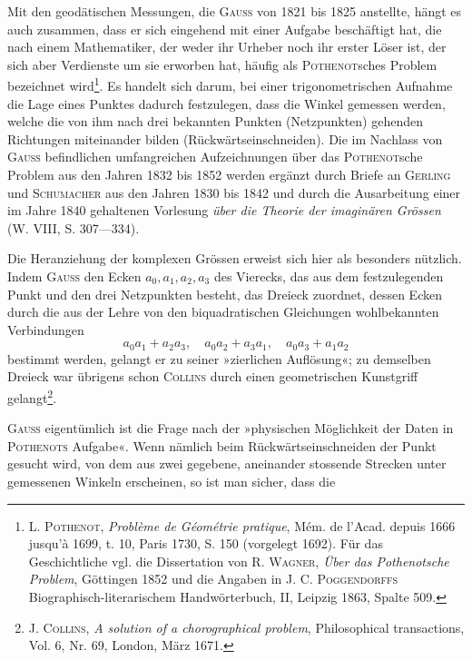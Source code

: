 \par
Mit den geodätischen Messungen, die \textsc{Gauss} von 1821 bis 1825 anstellte,
hängt es auch zusammen, dass er sich eingehend mit einer Aufgabe beschäftigt
hat, die nach einem Mathematiker, der weder ihr Urheber noch ihr erster
Löser ist, der sich aber Verdienste um sie erworben hat, häufig als \textsc{Pothenot}sches
Problem bezeichnet wird\footnote{L. \textsc{Pothenot}, \textit{Problème de Géométrie pratique}, Mém. de l’Acad. depuis 1666 jusqu’à 1699, t. 10, Paris 1730, S. 150 (vorgelegt 1692). Für das Geschichtliche vgl. die Dissertation von R. \textsc{Wagner}, \textit{Über das Pothenotsche Problem}, Göttingen 1852 und die Angaben in J. C. \textsc{Poggendorffs} Biographisch-literarischem Handwörterbuch, II, Leipzig 1863, Spalte 509.}. Es handelt sich darum, bei einer trigonometrischen
Aufnahme die Lage eines Punktes dadurch festzulegen, dass die
Winkel gemessen werden, welche die von ihm nach drei bekannten Punkten
(Netzpunkten) gehenden Richtungen miteinander bilden (Rückwärtseinschneiden).
Die im Nachlass von \textsc{Gauss} befindlichen umfangreichen Aufzeichnungen über
das \textsc{Pothenot}sche Problem aus den Jahren 1832 bis 1852 werden ergänzt
durch Briefe an \textsc{Gerling} und \textsc{Schumacher} aus den Jahren 1830 bis 1842 und
durch die Ausarbeitung einer im Jahre 1840 gehaltenen Vorlesung \textit{über die
Theorie der imaginären Grössen} (W. VIII, S. 307—334).
\par
Die Heranziehung der komplexen Grössen erweist sich hier als besonders
nützlich. Indem \textsc{Gauss} den Ecken \(a_0,a_1,a_2,a_3\) des Vierecks, das aus dem
festzulegenden Punkt und den drei Netzpunkten besteht, das Dreieck zuordnet,
dessen Ecken durch die aus der Lehre von den biquadratischen Gleichungen
wohlbekannten Verbindungen
\[
a_0a_1+a_2a_3,\quad a_0a_2+a_3a_1,\quad a_0a_3+a_1a_2
\]
bestimmt werden, gelangt er zu seiner »zierlichen Auflösung«; zu demselben
Dreieck war übrigens schon \textsc{Collins} durch einen geometrischen Kunstgriff
gelangt\footnote{J. \textsc{Collins}, \textit{A solution of a chorographical problem}, Philosophical transactions, Vol. 6, Nr. 69, London, März 1671.}.
\par
\textsc{Gauss} eigentümlich ist die Frage nach der »physischen Möglichkeit der
Daten in \textsc{Pothenots} Aufgabe«. Wenn nämlich beim Rückwärtseinschneiden
der Punkt gesucht wird, von dem aus zwei gegebene, aneinander stossende
Strecken unter gemessenen Winkeln erscheinen, so ist man sicher, dass die
\par\smallskip{}\par
